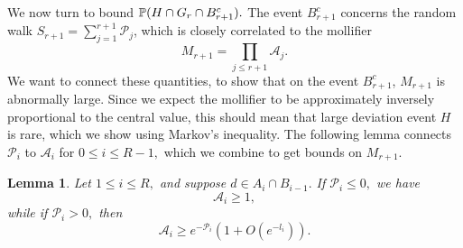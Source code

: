 \documentclass[12pt]{amsart}
\def\P{\ensuremath\mathbb{P}}
\numberwithin{equation}{section}
\newtheorem{lem}[thm]{Lemma}
\numberwithin{thm}{section}
\newcommand{\1}{\mathbf 1}
\begin{document}
We now turn to bound $ \P(H\cap G_r\cap B_{r+1}^c).$ 
The event $B_{r+1}^c$ concerns the random walk $S_{{r+1}}=\sum^{r+1}_{j=1}\mathscr{P}_{j}$, which is closely correlated to the mollifier $$M_{r+1}=\prod_{j\le r+1}\mathscr{A}_j.$$ We want to connect these quantities, to show that on the event $B_{r+1}^c$, $M_{r+1}$ is abnormally large. Since we expect the mollifier to be approximately inversely proportional to the central value, this should mean that large deviation event $H$ is rare, which we show using Markov's inequality. The following lemma connects  $\mathscr{P}_{{i}}$ to $\mathscr{A}_{i}$ for $0\le i \le R-1,$ which we combine to get bounds on $M_{r+1}.$
\newpage
\begin{lem}\label{Mollbig}
	Let $1\le i\le R, $ and suppose $d\in A_{i}\cap B_{i-1}.$ If $\mathscr{P}_{i}\le 0,$ we have 
	\begin{equation}\label{trivbound}
		\mathscr{A}_i\ge 1, 
	\end{equation}
while if $\mathscr{P}_{i}> 0,$ then
	\begin{equation}\label{inB}
	\mathscr{A}_{i}\ge	e^{-\mathscr{P}_{i}} \left(1+O\left(e^{-{l_{i}}}\right)\right).
	\end{equation} 
\end{lem}
\end{document}
